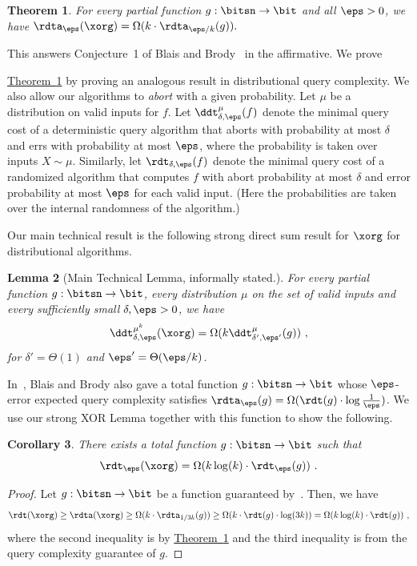 \documentclass[11pt]{article}
\numberwithin{equation}{section}
\newtheorem{theorem}{Theorem}[section]
\newtheorem{lemma}[theorem]{Lemma}
\newtheorem{corollary}[theorem]{Corollary}
\theoremstyle{definition}
\theoremstyle{plain}
\newcommand{\expref}[2]{\hyperref[#2]{#1~\ref{#2}}}
\begin{document}
\begin{theorem}\label{thm:sds-xor}
  For every
  partial %
  function $g:\bitsn \rightarrow \bit$ and all $\eps>0$, we
  have $\rdta_\eps(\xorg) = \Omega(k\cdot \rdta_{\eps/k}(g)).$
\end{theorem}


%
%
%
%
%
%
%
%
%
%
%
%
%
%
 This answers Conjecture~1 of Blais and
Brody~\cite{BlaisB19} in the affirmative.  We prove

\expref{Theorem}{thm:sds-xor} by proving an analogous result in
distributional query complexity.  %
%
%
We also allow our algorithms to \emph{abort} with 
%
%
%
%
%
a given  %
probability.
Let $\mu$ be a distribution on valid inputs for $f$. %
Let $\ddt_{\delta,\eps}^\mu(f)$ denote the minimal query cost of a
deterministic query algorithm that aborts with probability at most
$\delta$ and errs with probability at most $\eps$, where the
probability is taken over inputs $X \sim \mu$.  %
%
Similarly, let
$\rdt_{\delta,\eps}(f)$ denote the minimal query cost of a randomized
algorithm that computes $f$ with abort probability at most $\delta$
and error probability at most $\eps$ %
for each
valid %
input. %
%
(Here the  %
probabilities are taken over the internal randomness of 
the algorithm.)

Our main technical result is the following strong direct sum result
for $\xorg$ for distributional algorithms.
\begin{lemma}[Main Technical Lemma, informally stated.]\label{lemma:main}
  For every
  partial %
  function $g:\bitsn \rightarrow \bit$, every distribution
  $\mu$
  on the set of valid inputs  %
  and every
  sufficiently small  %
  $\delta,\eps>0$, we have
  $$\ddt_{\delta,\eps}^{\mu^k}(\xorg) =
  \Omega(k\ddt_{\delta',\eps'}^\mu(g))\ ,$$ for $\delta' = \Theta(1)$
  and $\eps' = \Theta(\eps/k)$.
\end{lemma}

In~\cite{BlaisB19}, Blais and Brody also gave a total function
$g:\bitsn\rightarrow \bit$ whose $\eps$-error
%
expected  %
query complexity
satisfies $\rdta_\eps(g) = \Omega(\rdt(g)\cdot \log \frac{1}{\eps})$.
We use our strong XOR Lemma together with this function to show the following.

\begin{corollary}\label{cor:application}
  There exists a total function $g:\bitsn \rightarrow \bit$ such that
  $$\rdt_\eps(\xorg) = \Omega(k\log(k)\cdot \rdt_\eps(g))\ .$$
\end{corollary}
\begin{proof}
  Let $g: \bitsn \rightarrow \bit$ be a function guaranteed
  by~\cite{BlaisB19}.  Then, we have
  $$\rdt(\xorg) \geq \rdta(\xorg) \geq \Omega(k\cdot \rdta_{1/3k}(g)) \geq
  \Omega(k\cdot \rdt(g)\cdot \log(3k)) = \Omega(k\log(k)\cdot \rdt(g))\ ,$$
  where the second inequality is by \expref{Theorem}{thm:sds-xor} and the
  third inequality is from the query complexity guarantee of $g$.
\end{proof}
\end{document}

